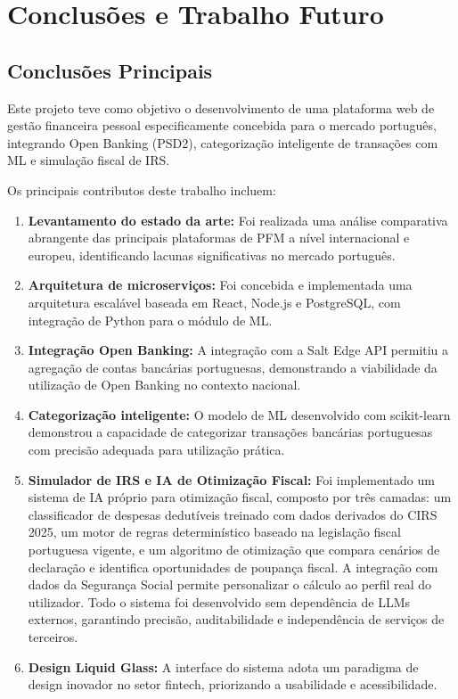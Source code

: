 \chapter{Conclusões e Trabalho Futuro}
\label{chap:conclusoes}

\section{Conclusões Principais}
\label{sec:conc-principais}


Este projeto teve como objetivo o desenvolvimento de uma plataforma web de gestão financeira pessoal especificamente concebida para o mercado português, integrando Open Banking (\ac{PSD2}), categorização inteligente de transações com \ac{ML} e simulação fiscal de \ac{IRS}.

Os principais contributos deste trabalho incluem:

\begin{enumerate}
    \item \textbf{Levantamento do estado da arte:} Foi realizada uma análise comparativa abrangente das principais plataformas de \ac{PFM} a nível internacional e europeu, identificando lacunas significativas no mercado português.

    \item \textbf{Arquitetura de microserviços:} Foi concebida e implementada uma arquitetura escalável baseada em React, Node.js e PostgreSQL, com integração de Python para o módulo de \ac{ML}.

    \item \textbf{Integração Open Banking:} A integração com a Salt Edge \ac{API} permitiu a agregação de contas bancárias portuguesas, demonstrando a viabilidade da utilização de Open Banking no contexto nacional.

    \item \textbf{Categorização inteligente:} O modelo de \ac{ML} desenvolvido com scikit-learn demonstrou a capacidade de categorizar transações bancárias portuguesas com precisão adequada para utilização prática.

    \item \textbf{Simulador de IRS e IA de Otimização Fiscal:} Foi implementado um sistema de \ac{IA} próprio para otimização fiscal, composto por três camadas: um classificador de despesas dedutíveis treinado com dados derivados do \ac{CIRS} 2025, um motor de regras determinístico baseado na legislação fiscal portuguesa vigente, e um algoritmo de otimização que compara cenários de declaração e identifica oportunidades de poupança fiscal. A integração com dados da Segurança Social permite personalizar o cálculo ao perfil real do utilizador. Todo o sistema foi desenvolvido sem dependência de \ac{LLM}s externos, garantindo precisão, auditabilidade e independência de serviços de terceiros.

    \item \textbf{Design Liquid Glass:} A interface do sistema adota um paradigma de design inovador no setor fintech, priorizando a usabilidade e acessibilidade.
\end{enumerate}

